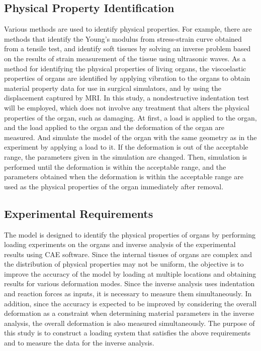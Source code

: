 \subsection*{Physical Property Identification}
Various methods are used to identify physical properties. For example, there are methods that identify the Young's modulus from stress-strain curve obtained from a tensile test, and identify soft tissues by solving an inverse problem based on the results of strain measurement of the tissue using ultrasonic waves. As a method for identifying the physical properties of living organs, the viscoelastic properties of organs are identified by applying vibration to the organs to obtain material property data for use in surgical simulators, and by using the displacement captured by MRI. In this study, a nondestructive indentation test will be employed, which does not involve any treatment that alters the physical properties of the organ, such as damaging. At first, a load is applied to the organ, and the load applied to the organ and the deformation of the organ are measured. And simulate the model of the organ with the same geometry as in the experiment by applying a load to it. If the deformation is out of the acceptable range, the parameters given in the simulation are changed. Then, simulation is performed until the deformation is within the acceptable range, and the parameters obtained when the deformation is within the acceptable range are used as the physical properties of the organ immediately after removal.

\subsection*{Experimental Requirements}
The model is designed to identify the physical properties of organs by performing loading experiments on the organs and inverse analysis of the experimental results using CAE software. Since the internal tissues of organs are complex and the distribution of physical properties may not be uniform, the objective is to improve the accuracy of the model by loading at multiple locations and obtaining results for various deformation modes. Since the inverse analysis uses indentation and reaction forces as inputs, it is necessary to measure them simultaneously. In addition, since the accuracy is expected to be improved by considering the overall deformation as a constraint when determining material parameters in the inverse analysis, the overall deformation is also measured simultaneously. The purpose of this study is to construct a loading system that satisfies the above requirements and to measure the data for the inverse analysis.

